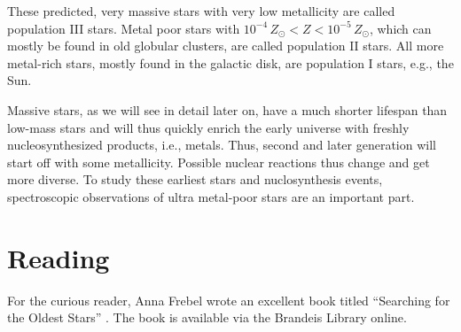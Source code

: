 These predicted, very massive stars with very low metallicity are called population III stars. Metal poor stars with $10^{-4}\,Z_\odot < Z < 10^{-5}\,Z_\odot$, which can mostly be found in old globular clusters, are called population II stars. All more metal-rich stars, mostly found in the galactic disk, are population I stars, e.g., the Sun.

Massive stars, as we will see in detail later on, have a much shorter lifespan than low-mass stars and will thus quickly enrich the early universe with freshly nucleosynthesized products, i.e., metals. Thus, second and later generation will start off with some metallicity. Possible nuclear reactions thus change and get more diverse. To study these earliest stars and nuclosynthesis events, spectroscopic observations of ultra metal-poor stars are an important part. 



\section{Reading}

For the curious reader, Anna Frebel wrote an excellent book titled ``Searching for the Oldest Stars'' \citep{frebel15}. The book is available via the Brandeis Library online.

